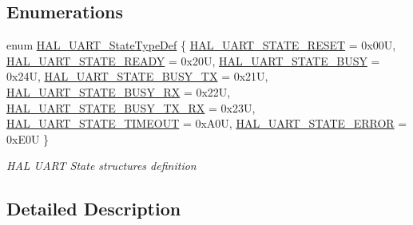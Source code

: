 \subsection*{Enumerations}
\begin{DoxyCompactItemize}
\item 
enum \mbox{\hyperlink{group___u_a_r_t___exported___types_gaf55d844a35379c204c90be5d1e8e50ba}{H\+A\+L\+\_\+\+U\+A\+R\+T\+\_\+\+State\+Type\+Def}} \{ \newline
\mbox{\hyperlink{group___u_a_r_t___exported___types_ggaf55d844a35379c204c90be5d1e8e50baa9c7d889fce61ccc717228d099a61d113}{H\+A\+L\+\_\+\+U\+A\+R\+T\+\_\+\+S\+T\+A\+T\+E\+\_\+\+R\+E\+S\+ET}} = 0x00U, 
\mbox{\hyperlink{group___u_a_r_t___exported___types_ggaf55d844a35379c204c90be5d1e8e50baade763629c1bdb4f08e52ef79d6e0900e}{H\+A\+L\+\_\+\+U\+A\+R\+T\+\_\+\+S\+T\+A\+T\+E\+\_\+\+R\+E\+A\+DY}} = 0x20U, 
\mbox{\hyperlink{group___u_a_r_t___exported___types_ggaf55d844a35379c204c90be5d1e8e50baad1eddce038ba828e8b4061a33a2d8801}{H\+A\+L\+\_\+\+U\+A\+R\+T\+\_\+\+S\+T\+A\+T\+E\+\_\+\+B\+U\+SY}} = 0x24U, 
\mbox{\hyperlink{group___u_a_r_t___exported___types_ggaf55d844a35379c204c90be5d1e8e50baadc97ca42e9b05a08cb98e6721e27e80c}{H\+A\+L\+\_\+\+U\+A\+R\+T\+\_\+\+S\+T\+A\+T\+E\+\_\+\+B\+U\+S\+Y\+\_\+\+TX}} = 0x21U, 
\newline
\mbox{\hyperlink{group___u_a_r_t___exported___types_ggaf55d844a35379c204c90be5d1e8e50baaf7929f7aebd6b450c25907904411680b}{H\+A\+L\+\_\+\+U\+A\+R\+T\+\_\+\+S\+T\+A\+T\+E\+\_\+\+B\+U\+S\+Y\+\_\+\+RX}} = 0x22U, 
\mbox{\hyperlink{group___u_a_r_t___exported___types_ggaf55d844a35379c204c90be5d1e8e50baa2fdde93f9f55972b7133bf7c75dd2e8a}{H\+A\+L\+\_\+\+U\+A\+R\+T\+\_\+\+S\+T\+A\+T\+E\+\_\+\+B\+U\+S\+Y\+\_\+\+T\+X\+\_\+\+RX}} = 0x23U, 
\mbox{\hyperlink{group___u_a_r_t___exported___types_ggaf55d844a35379c204c90be5d1e8e50baa90891eeb767df19780e620a15bec807d}{H\+A\+L\+\_\+\+U\+A\+R\+T\+\_\+\+S\+T\+A\+T\+E\+\_\+\+T\+I\+M\+E\+O\+UT}} = 0x\+A0U, 
\mbox{\hyperlink{group___u_a_r_t___exported___types_ggaf55d844a35379c204c90be5d1e8e50baa5d50bfe0750db02c4fd03d778c8c318c}{H\+A\+L\+\_\+\+U\+A\+R\+T\+\_\+\+S\+T\+A\+T\+E\+\_\+\+E\+R\+R\+OR}} = 0x\+E0U
 \}
\begin{DoxyCompactList}\small\item\em H\+AL U\+A\+RT State structures definition ~\newline
 \end{DoxyCompactList}\end{DoxyCompactItemize}


\subsection{Detailed Description}


